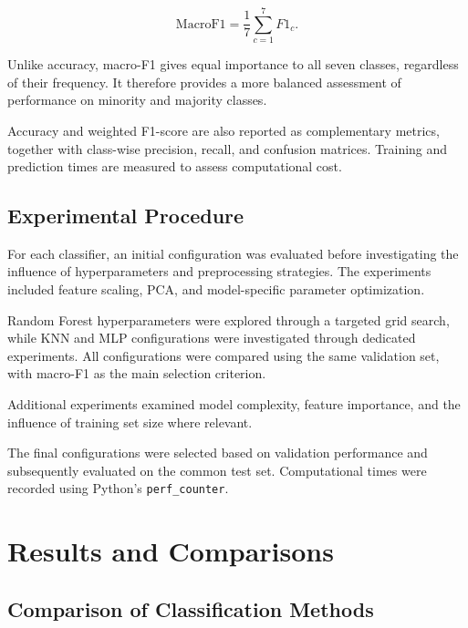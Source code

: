 \documentclass[10pt,a4paper]{article}
\begin{document}
\begin{equation}
\mathrm{MacroF1} =
\frac{1}{7}\sum_{c=1}^{7}F1_c.
\end{equation}

Unlike accuracy, macro-F1 gives equal importance
to all seven classes, regardless of their frequency.
It therefore provides a more balanced assessment
of performance on minority and majority classes.

Accuracy and weighted F1-score are also reported
as complementary metrics, together with class-wise
precision, recall, and confusion matrices.
Training and prediction times are measured to
assess computational cost.


\subsection{Experimental Procedure}

For each classifier, an initial configuration was
evaluated before investigating the influence of
hyperparameters and preprocessing strategies.
The experiments included feature scaling, PCA,
and model-specific parameter optimization.

Random Forest hyperparameters were explored through
a targeted grid search, while KNN and MLP configurations
were investigated through dedicated experiments.
All configurations were compared using the same
validation set, with macro-F1 as the main selection
criterion.

Additional experiments examined model complexity,
feature importance, and the influence of training
set size where relevant.

The final configurations were selected based on
validation performance and subsequently evaluated
on the common test set. Computational times were
recorded using Python's \texttt{perf\_counter}.



\section{Results and Comparisons}

\subsection{Comparison of Classification Methods}
\end{document}
